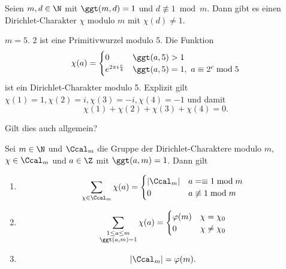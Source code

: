 \begin{lem}\autolabel
	Seien $m,d \in \N$ mit $\ggt(m,d)=1$ und $d \not\equiv1 \bmod m$. Dann gibt es einen Dirichlet-Charakter $\chi$ modulo $m$ mit $\chi(d) \neq 1$.
\end{lem}

\begin{exmp*}
	$m = 5$. 2 ist eine Primitivwurzel modulo 5. Die Funktion
	\[ \chi(a) = \begin{cases}
		0 &\ggt(a,5)>1\\
		e^{2\pi i \frac{c}{4}} &\ggt(a,5)=1,\ a \equiv 2^c \bmod 5
	\end{cases} \]
	ist ein Dirichlet-Charakter modulo 5. Explizit gilt $\chi(1)=1, \chi(2)=i,\chi(3)=-i,\chi(4)=-1$ und damit
	\[ \chi(1)+\chi(2)+\chi(3)+\chi(4)=0. \]
\end{exmp*}

\begin{frage*}
	Gilt dies auch allgemein?
\end{frage*}

\begin{thm}\autolabel
	Sei $m \in \N$ und $\Ccal_m$ die Gruppe der Dirichlet-Charaktere modulo $m$, $\chi \in \Ccal_m$ und $a \in \Z$ mit $\ggt(a,m)=1$. Dann gilt
	\begin{enumerate}[label={\roman*})]
		\item \[ \sum_{\chi \in \Ccal_m} \chi(a) = \begin{cases}
				|\Ccal_m| &a= \equiv 1 \bmod m\\
				0 &a \not\equiv 1 \bmod m
			\end{cases} \]
		\item \[ \sum_{\substack{1 \leq a \leq m\\\ggt(a,m)=1}} \chi(a) = \begin{cases}
				\varphi(m) &\chi = \chi_0\\
				0 &\chi \neq \chi_0
			\end{cases} \]
		\item \[ |\Ccal_m| = \varphi(m). \]
	\end{enumerate}
\end{thm}